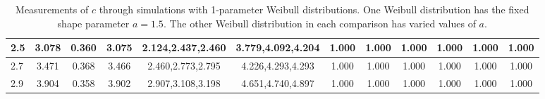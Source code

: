 \begin{table*}[h!]
\begin{center}
\begin{tabular}{| l | c | c | c | c | c | c | c | c | c | c | c |}
2.5 & 3.078 & 0.360 & 3.075 & 2.124,2.437,2.460 & 3.779,4.092,4.204  & 1.000  & 1.000  & 1.000  & 1.000  & 1.000  & 1.000 \\\hline
2.7 & 3.471 & 0.368 & 3.466 & 2.460,2.773,2.795 & 4.226,4.293,4.293  & 1.000  & 1.000  & 1.000  & 1.000  & 1.000  & 1.000 \\\hline
2.9 & 3.904 & 0.358 & 3.902 & 2.907,3.108,3.198 & 4.651,4.740,4.897  & 1.000  & 1.000  & 1.000  & 1.000  & 1.000  & 1.000 \\\hline
\end{tabular}
\caption{Measurements of $c$ through simulations
with 1-parameter Weibull distributions.
One Weibull distribution has the fixed shape parameter $a=1.5$.
The other Weibull distribution in each comparison
has varied values of $a$.}
\end{center}
\end{table*}